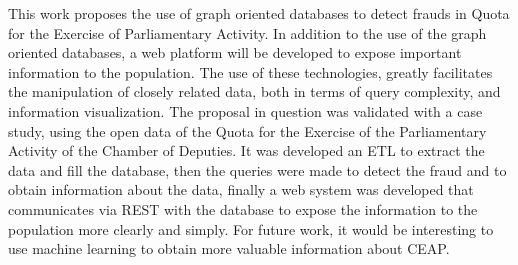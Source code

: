	This work proposes the use of graph oriented databases to detect frauds in Quota for the Exercise of Parliamentary Activity. In addition to the use of the graph oriented databases, a web platform will be developed to expose important information to the population. The use of these technologies, greatly facilitates the manipulation of closely related data, both in terms of query complexity, and information visualization. The proposal in question was validated with a case study, using the open data of the Quota for the Exercise of the Parliamentary Activity of the Chamber of Deputies. It was developed an ETL to extract the data and fill the database, then the queries were made to detect the fraud and to obtain information about the data, finally a web system was developed that communicates via REST with the database to expose the information to the population more clearly and simply. For future work, it would be interesting to use machine learning to obtain more valuable information about CEAP.
